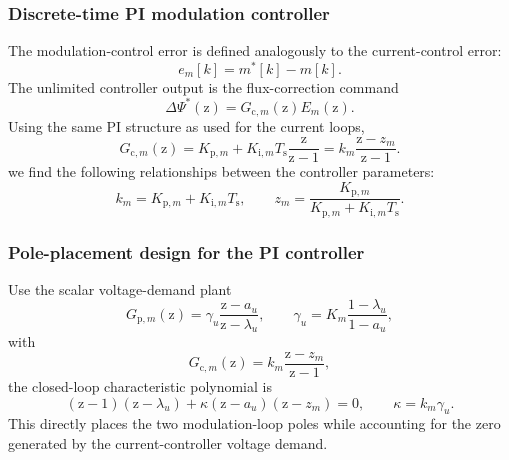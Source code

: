 \begin{frame}
    \frametitle{Discrete-time PI modulation controller}
    The modulation-control error is defined analogously to the current-control error:
    \begin{equation}
        e_m[k] = m^*[k]-m[k] .
    \end{equation}
    The unlimited controller output is the flux-correction command
    \begin{equation}
        \Delta\Psi^{*}(\mathrm{z})
        =
        G_{\mathrm{c},m}(\mathrm{z})E_m(\mathrm{z}) .
    \end{equation}
    Using the same PI structure as used for the current loops,
    \begin{equation}
        G_{\mathrm{c},m}(\mathrm{z})
        =
        K_{\mathrm{p},m}
        +
        K_{\mathrm{i},m}T_{\mathrm{s}}\frac{\mathrm{z}}{\mathrm{z}-1}
        =
        k_m\frac{\mathrm{z}-z_m}{\mathrm{z}-1}.
    \end{equation}
    we find the following relationships between the controller parameters:
    \begin{equation}
        k_m=K_{\mathrm{p},m}+K_{\mathrm{i},m}T_{\mathrm{s}},
        \qquad
        z_m=
        \frac{K_{\mathrm{p},m}}{K_{\mathrm{p},m}+K_{\mathrm{i},m}T_{\mathrm{s}}}.
    \end{equation}
\end{frame}

\begin{frame}
    \frametitle{Pole-placement design for the PI controller}
    Use the scalar voltage-demand plant
    \begin{equation}
        G_{\mathrm{p},m}(\mathrm{z})
        =
        \gamma_u\frac{\mathrm{z}-a_u}{\mathrm{z}-\lambda_u},
        \qquad
        \gamma_u=
        K_{m}\frac{1-\lambda_u}{1-a_u},
    \end{equation}
    with
    \begin{equation}
        G_{\mathrm{c},m}(\mathrm{z})
        =
        k_m\frac{\mathrm{z}-z_m}{\mathrm{z}-1},
    \end{equation}
    the closed-loop characteristic polynomial is
    \begin{equation}
        (\mathrm{z}-1)(\mathrm{z}-\lambda_u)
        +
        \kappa(\mathrm{z}-a_u)(\mathrm{z}-z_m)
        =
        0,
        \qquad
        \kappa=k_m\gamma_u .
    \end{equation}
    This directly places the two modulation-loop poles while accounting for the zero generated by the current-controller voltage demand.
\end{frame}


